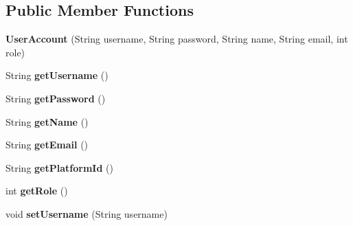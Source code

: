 \subsection*{Public Member Functions}
\begin{DoxyCompactItemize}
\item 
{\bfseries User\+Account} (String username, String password, String name, String email, int role)\hypertarget{classeu_1_1h2020_1_1symbiote_1_1model_1_1UserAccount_a1b129545cdae89fa60c0f2933f5ab2de}{}\label{classeu_1_1h2020_1_1symbiote_1_1model_1_1UserAccount_a1b129545cdae89fa60c0f2933f5ab2de}

\item 
String {\bfseries get\+Username} ()\hypertarget{classeu_1_1h2020_1_1symbiote_1_1model_1_1UserAccount_ad6495d2b5dece2369310352a6596b685}{}\label{classeu_1_1h2020_1_1symbiote_1_1model_1_1UserAccount_ad6495d2b5dece2369310352a6596b685}

\item 
String {\bfseries get\+Password} ()\hypertarget{classeu_1_1h2020_1_1symbiote_1_1model_1_1UserAccount_a13a987693380e0e8679b6aa6edfacc87}{}\label{classeu_1_1h2020_1_1symbiote_1_1model_1_1UserAccount_a13a987693380e0e8679b6aa6edfacc87}

\item 
String {\bfseries get\+Name} ()\hypertarget{classeu_1_1h2020_1_1symbiote_1_1model_1_1UserAccount_aca22562f52c72362e3cae9f5266248ba}{}\label{classeu_1_1h2020_1_1symbiote_1_1model_1_1UserAccount_aca22562f52c72362e3cae9f5266248ba}

\item 
String {\bfseries get\+Email} ()\hypertarget{classeu_1_1h2020_1_1symbiote_1_1model_1_1UserAccount_a97b599eb1aaea5a2943db5d32de43c2b}{}\label{classeu_1_1h2020_1_1symbiote_1_1model_1_1UserAccount_a97b599eb1aaea5a2943db5d32de43c2b}

\item 
String {\bfseries get\+Platform\+Id} ()\hypertarget{classeu_1_1h2020_1_1symbiote_1_1model_1_1UserAccount_a343e7b6b3497ca7260c52388ad24da93}{}\label{classeu_1_1h2020_1_1symbiote_1_1model_1_1UserAccount_a343e7b6b3497ca7260c52388ad24da93}

\item 
int {\bfseries get\+Role} ()\hypertarget{classeu_1_1h2020_1_1symbiote_1_1model_1_1UserAccount_a0d293520e72d938d1ae798603bcddaa5}{}\label{classeu_1_1h2020_1_1symbiote_1_1model_1_1UserAccount_a0d293520e72d938d1ae798603bcddaa5}

\item 
void {\bfseries set\+Username} (String username)\hypertarget{classeu_1_1h2020_1_1symbiote_1_1model_1_1UserAccount_a36810609ea028f6bc4e2480eda127725}{}\label{classeu_1_1h2020_1_1symbiote_1_1model_1_1UserAccount_a36810609ea028f6bc4e2480eda127725}


\end{DoxyCompactItemize}
